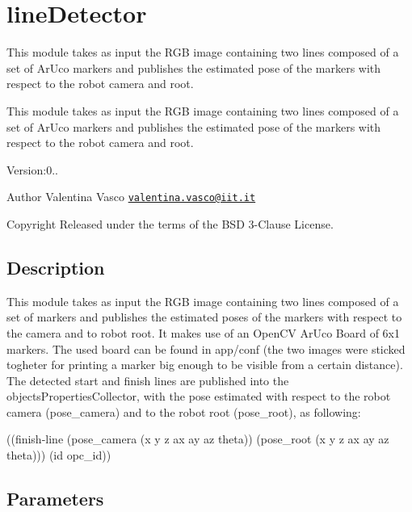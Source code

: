 \section{line\+Detector}
\label{group__lineDetector}


This module takes as input the R\+GB image containing two lines composed of a set of Ar\+Uco markers and publishes the estimated pose of the markers with respect to the robot camera and root.  


This module takes as input the R\+GB image containing two lines composed of a set of Ar\+Uco markers and publishes the estimated pose of the markers with respect to the robot camera and root. 

Version\+:0.. \begin{DoxyAuthor}{Author}
Valentina Vasco \href{mailto:valentina.vasco@iit.it}{\tt valentina.\+vasco@iit.\+it} ~\newline
 
\end{DoxyAuthor}
\begin{DoxyCopyright}{Copyright}
Released under the terms of the B\+SD 3-\/\+Clause License. 
\end{DoxyCopyright}
\hypertarget{group__skeletonViewer_intro_sec}{}\subsection{Description}\label{group__skeletonViewer_intro_sec}
This module takes as input the R\+GB image containing two lines composed of a set of markers and publishes the estimated poses of the markers with respect to the camera and to robot root. It makes use of an Open\+CV Ar\+Uco Board of 6x1 markers. The used board can be found in {\ttfamily app/conf} (the two images were sticked togheter for printing a marker big enough to be visible from a certain distance). The detected start and finish lines are published into the objects\+Properties\+Collector, with the pose estimated with respect to the robot camera ({\ttfamily pose\+\_\+camera}) and to the robot root ({\ttfamily pose\+\_\+root}), as following\+:


\begin{DoxyCode}
((finish-line (pose\_camera (x y z ax ay az theta)) (pose\_root (x y z ax ay az theta))) (\textcolor{keywordtype}{id} opc\_id))
\end{DoxyCode}
\hypertarget{group__skeletonViewer_parameters_sec}{}\subsection{Parameters}\label{group__skeletonViewer_parameters_sec}

